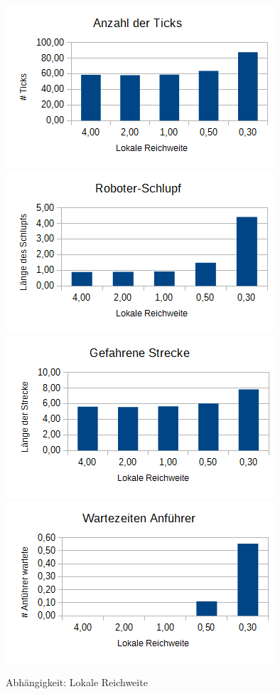 \begin{figure}[h]
	\includegraphics[width=\sectionTransportPictureWidth , keepaspectratio]{graphics/Statistics/Transport/Range_Observations.png}
	\includegraphics[width=\sectionTransportPictureWidth , keepaspectratio]{graphics/Statistics/Transport/Range_Slack.png}
	\includegraphics[width=\sectionTransportPictureWidth , keepaspectratio]{graphics/Statistics/Transport/Range_Way.png}
	\includegraphics[width=\sectionTransportPictureWidth , keepaspectratio]{graphics/Statistics/Transport/Range_Move.png}
	\caption{Abhängigkeit: Lokale Reichweite}
	\label{pic:TransportRange}
\end{figure}

